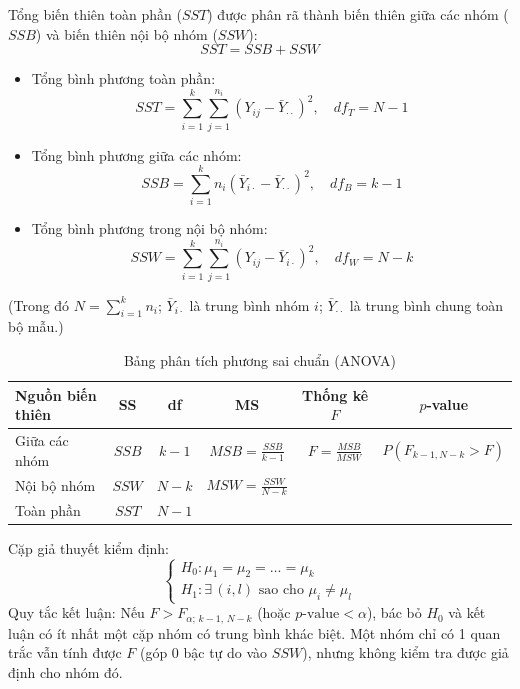 \documentclass[12pt,a4paper]{article}
\begin{document}
Tổng biến thiên toàn phần ($SST$) được phân rã thành biến thiên giữa các nhóm ($SSB$) và biến
thiên nội bộ nhóm ($SSW$):
\begin{equation}
  SST = SSB + SSW
\end{equation}
\begin{itemize}
  \item Tổng bình phương toàn phần:
  \begin{equation}
    SST = \sum_{i=1}^{k}\sum_{j=1}^{n_i}(Y_{ij} - \bar{Y}_{\cdot\cdot})^2, \quad df_T = N-1
  \end{equation}
  \item Tổng bình phương giữa các nhóm:
  \begin{equation}
    SSB = \sum_{i=1}^{k} n_i(\bar{Y}_{i\cdot} - \bar{Y}_{\cdot\cdot})^2, \quad df_B = k-1
  \end{equation}
  \item Tổng bình phương trong nội bộ nhóm:
  \begin{equation}
    SSW = \sum_{i=1}^{k}\sum_{j=1}^{n_i}(Y_{ij} - \bar{Y}_{i\cdot})^2, \quad df_W = N-k
  \end{equation}
\end{itemize}
(Trong đó $N = \sum_{i=1}^{k} n_i$; $\bar{Y}_{i\cdot}$ là trung bình nhóm $i$;
$\bar{Y}_{\cdot\cdot}$ là trung bình chung toàn bộ mẫu.)

\begin{table}[H]
\centering
\caption{Bảng phân tích phương sai chuẩn (ANOVA)}
\label{tab:anova}
\begin{tabular}{l c c c c c}
\toprule
Nguồn biến thiên & SS & df & MS & Thống kê $F$ & $p$-value \\
\midrule
Giữa các nhóm & $SSB$ & $k-1$ & $MSB = \frac{SSB}{k-1}$ & $F = \frac{MSB}{MSW}$ & $P(F_{k-1,N-k} > F)$ \\
Nội bộ nhóm   & $SSW$ & $N-k$ & $MSW = \frac{SSW}{N-k}$ & & \\
Toàn phần     & $SST$ & $N-1$ & & & \\
\bottomrule
\end{tabular}
\end{table}

Cặp giả thuyết kiểm định:
\begin{equation}
  \begin{cases}
    H_0: \mu_1 = \mu_2 = \dots = \mu_k\\
    H_1: \exists\,(i,l) \text{ sao cho } \mu_i \ne \mu_l
  \end{cases}
\end{equation}
Quy tắc kết luận: Nếu $F > F_{\alpha;\,k-1,\,N-k}$ (hoặc $p\text{-value} < \alpha$), bác bỏ $H_0$
và kết luận có ít nhất một cặp nhóm có trung bình khác biệt. Một nhóm chỉ có 1 quan trắc vẫn
tính được $F$ (góp 0 bậc tự do vào $SSW$), nhưng không kiểm tra được giả định cho nhóm đó.
\end{document}
